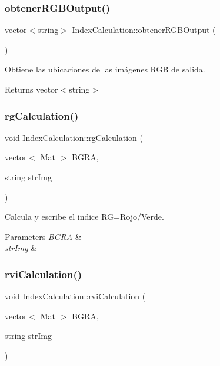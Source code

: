 \subsubsection{\texorpdfstring{obtener\+R\+G\+B\+Output()}{obtenerRGBOutput()}}
{\footnotesize\ttfamily vector$<$string$>$ Index\+Calculation\+::obtener\+R\+G\+B\+Output (\begin{DoxyParamCaption}{ }\end{DoxyParamCaption})\hspace{0.3cm}{\ttfamily [inline]}}



Obtiene las ubicaciones de las imágenes R\+GB de salida. 

\begin{DoxyReturn}{Returns}
vector$<$string$>$ 
\end{DoxyReturn}
\mbox{\label{classIndexCalculation_a562111a1b8920fa0136811ecd7e51e36}} 
\subsubsection{\texorpdfstring{rg\+Calculation()}{rgCalculation()}}
{\footnotesize\ttfamily void Index\+Calculation\+::rg\+Calculation (\begin{DoxyParamCaption}\item[{vector$<$ Mat $>$}]{B\+G\+RA,  }\item[{string}]{str\+Img }\end{DoxyParamCaption})\hspace{0.3cm}{\ttfamily [inline]}}



Calcula y escribe el indice RG=Rojo/\+Verde. 


\begin{DoxyParams}{Parameters}
{\em B\+G\+RA} & \\
\hline
{\em str\+Img} & \\
\hline
\end{DoxyParams}
\mbox{\label{classIndexCalculation_abd44fe3dd27ccd9641f29152fdf19a2e}} 
\subsubsection{\texorpdfstring{rvi\+Calculation()}{rviCalculation()}}
{\footnotesize\ttfamily void Index\+Calculation\+::rvi\+Calculation (\begin{DoxyParamCaption}\item[{vector$<$ Mat $>$}]{B\+G\+RA,  }\item[{string}]{str\+Img }\end{DoxyParamCaption})\hspace{0.3cm}{\ttfamily [inline]}}



